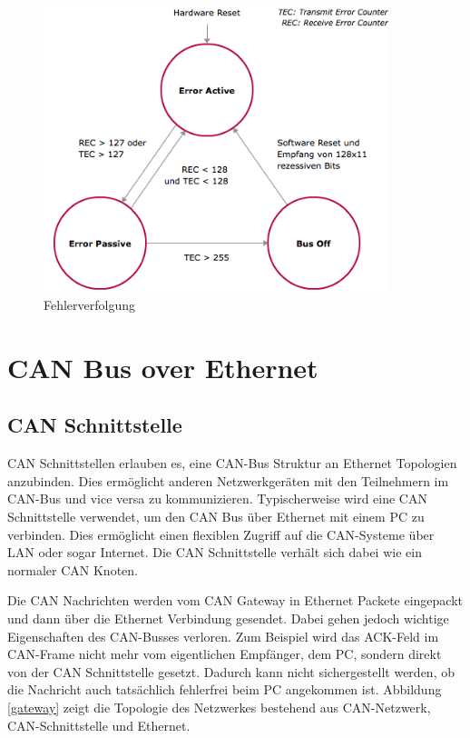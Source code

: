 \begin{figure}[h] 
\centering
\includegraphics[width=0.9\textwidth]{figures/errcount}
\caption{Fehlerverfolgung \citep{VEC}} 
\label{pic:errcount}
\end{figure} 

\clearpage
\section{CAN Bus over Ethernet}
	
\subsection{CAN Schnittstelle}

CAN Schnittstellen erlauben es, eine CAN-Bus Struktur an Ethernet Topologien anzubinden. 
Dies ermöglicht anderen Netzwerkgeräten mit den Teilnehmern im CAN-Bus und vice versa 
zu kommunizieren. Typischerweise wird eine CAN Schnittstelle verwendet, um den CAN Bus 
über Ethernet mit einem PC zu verbinden. Dies ermöglicht einen flexiblen Zugriff auf die 
CAN-Systeme über LAN oder sogar Internet. Die CAN Schnittstelle verhält sich dabei wie 
ein normaler CAN Knoten. \citep{STE}

Die CAN Nachrichten werden vom CAN Gateway in Ethernet Packete eingepackt und dann 
über die Ethernet Verbindung gesendet. Dabei gehen jedoch wichtige Eigenschaften des 
CAN-Busses verloren. Zum Beispiel wird das ACK-Feld im CAN-Frame nicht mehr vom 
eigentlichen Empfänger, dem PC, sondern direkt von der CAN Schnittstelle gesetzt. Dadurch 
kann nicht sichergestellt werden, ob die Nachricht auch tatsächlich fehlerfrei beim PC angekommen ist.
Abbildung \ref{gateway} zeigt die Topologie des Netzwerkes bestehend aus CAN-Netzwerk, 
CAN-Schnittstelle und Ethernet.

